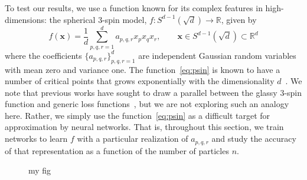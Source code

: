 \documentclass{article}
\begin{document}
To test our results, we use a function known for its complex
features in high-dimensions: the spherical 3-spin model,
$f: S^{d-1}(\sqrt{d}) \to \mathbb{R}$, given by
\begin{equation}
  \label{eq:psin}
  f(\mathbf{x}) = \frac1d \sum_{p,q,r=1}^d a_{p,q,r} x_p x_q x_r,  \qquad \mathbf{x}
  \in S^{d-1}(\sqrt{d}) \subset \mathbb{R}^d
\end{equation}
where the coefficients $\{a_{p,q,r}\}_{p,q,r=1}^d$ are independent
Gaussian random variables with mean zero and variance one. The
function~\eqref{eq:psin} is known to have a number of critical points
that grows exponentially with the dimensionality
$d$~\cite{Auffinger:2013kq,Sagun:2014tg,Auffinger:2012gh}. We note
that previous works have sought to draw a parallel between the glassy
3-spin function and generic loss
functions~\cite{Choromanska:2014ui}, but we are not exploring such an
analogy here. Rather, we simply use the function~\eqref{eq:psin} as a
difficult target for approximation by neural networks. That is,
throughout this section, we train networks to learn $f$ with a
particular realization of $a_{p,q,r}$ and study the accuracy of that
representation as a function of the number of particles $n$.

 \begin{figure}[H]\centering
{}
\caption{my fig}
\label{fig}
\end{figure}
\end{document}
